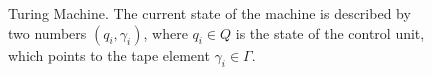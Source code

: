 \begin{figure}
\centering



\caption{Turing Machine. The current state of the machine is described by two
  numbers $(q_i, \gamma_i)$, where $q_i \in Q$ is the state of the control
  unit, which points to the tape element $\gamma_i \in \Gamma$.} 
\label{figAddAlgoTuring}
\end{figure}